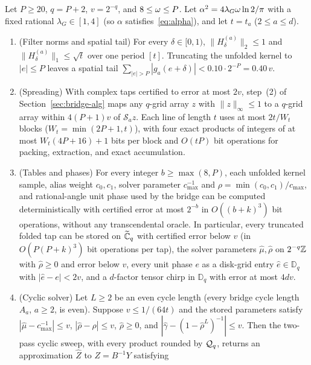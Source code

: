 \begin{lemma}\label{lem:bridge-C}
Let $P\ge 20$, $q=P+2$, $v=2^{-q}$, and $8\le\omega\le P$. Let $\alpha^2=4\lambda_G\omega\ln 2/\pi$ with a fixed rational
$\lambda_G\in[1,4]$ (so $\alpha$ satisfies~\eqref{eq:alpha}), and let $t=t_a$ ($2\le a\le d$).
\begin{enumerate}[label=(\roman*),leftmargin=*]
  \item \textup{(Filter norms and spatial tail)} For every $\delta\in[0,1)$, $\|H^{(a)}_\delta\|_2\le 1$ and
    $\|H^{(a)}_\delta\|_1\le\sqrt{t}$ over one period $[t]$. Truncating the unfolded kernel to $|e|\le P$ leaves a
    spatial tail $\sum_{|e|>P}|g_a(e+\delta)|<0.10\cdot 2^{-P}=0.40\,v$.
  \item \textup{(Spreading)} With complex taps certified to error at most $2v$, step~(2) of
    Section~\ref{sec:bridge-alg} maps any $q$-grid array $z$ with $\|z\|_\infty\le 1$ to a $q$-grid array within
    $4(P+1)v$ of $\mathcal S_a z$. Each line of length $t$ uses at most $2t/W_t$ blocks ($W_t=\min(2P+1,t)$), with four
    exact products of integers of at most $W_t(4P+16)+1$ bits per block and $O(tP)$ bit operations for packing,
    extraction, and exact accumulation.
  \item \textup{(Tables and phases)} For every integer $b\ge\max(8,P)$, each unfolded kernel sample, alias weight
    $c_0,c_1$, solver parameter $c_{\max}^{-1}$ and $\rho=\min(c_0,c_1)/c_{\max}$, and rational-angle unit phase used by
    the bridge can be computed deterministically with certified error at most $2^{-b}$ in $O((b+k)^3)$ bit operations,
    without any transcendental oracle. In particular, every truncated folded tap can be stored on $\widetilde{\mathbb{C}}_q$ with certified
    error below $v$ (in $O(P(P+k)^3)$ bit operations per tap), the solver parameters $\hat\mu,\hat\rho$ on $2^{-q}\mathbb{Z}$
    with $\hat\rho\ge 0$ and error below $v$, every unit phase $e$ as a disk-grid entry $\hat e\in\mathbb{D}_q$ with
    $|\hat e-e|<2v$, and a $d$-factor tensor chirp in $\mathbb{D}_q$ with error at most $4dv$.
  \item \textup{(Cyclic solver)} Let $L\ge 2$ be an even cycle length (every bridge cycle length $A_a$, $a\ge 2$, is
    even). Suppose $v\le 1/(64t)$ and the stored parameters satisfy $|\hat\mu-c_{\max}^{-1}|\le v$,
    $|\hat\rho-\rho|\le v$, $\hat\rho\ge 0$, and $|\hat\gamma-(1-\hat\rho^L)^{-1}|\le v$. Then the two-pass cyclic sweep,
    with every product rounded by $\mathcal{Q}_q$, returns an approximation $\widehat Z$ to $Z=B^{-1}Y$ satisfying

\end{enumerate}
\end{lemma}

